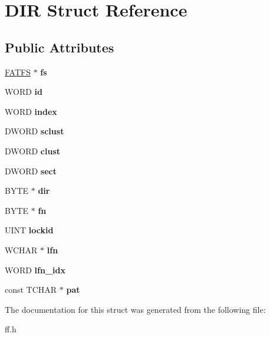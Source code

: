 \hypertarget{struct_d_i_r}{}\section{D\+IR Struct Reference}
\label{struct_d_i_r}
\subsection*{Public Attributes}
\begin{DoxyCompactItemize}
\item 
\mbox{\label{struct_d_i_r_a312eaa66cb703fb2993ea98173dc0c9a}} 
\hyperlink{struct_f_a_t_f_s}{F\+A\+T\+FS} $\ast$ {\bfseries fs}
\item 
\mbox{\label{struct_d_i_r_aca2c95a99a04173917ec70c030891383}} 
W\+O\+RD {\bfseries id}
\item 
\mbox{\label{struct_d_i_r_ab95119fbacbe45e3e9ee0f962b844092}} 
W\+O\+RD {\bfseries index}
\item 
\mbox{\label{struct_d_i_r_a9212af5877b94d790dd3bab3aa320994}} 
D\+W\+O\+RD {\bfseries sclust}
\item 
\mbox{\label{struct_d_i_r_acfbb8ba2d6e73b6f999ceffd1857c190}} 
D\+W\+O\+RD {\bfseries clust}
\item 
\mbox{\label{struct_d_i_r_ad01fcc812ed0dad11a593574336adc9e}} 
D\+W\+O\+RD {\bfseries sect}
\item 
\mbox{\label{struct_d_i_r_a6c2a8c0cf2d55ae99775e93a16593449}} 
B\+Y\+TE $\ast$ {\bfseries dir}
\item 
\mbox{\label{struct_d_i_r_a32da2f31d6c3b6c42eef981cb0cfd2ee}} 
B\+Y\+TE $\ast$ {\bfseries fn}
\item 
\mbox{\label{struct_d_i_r_a4506e8e241aea683cc1cd4d7c8db1008}} 
U\+I\+NT {\bfseries lockid}
\item 
\mbox{\label{struct_d_i_r_af62fd789383e6f1397f74617e11c135d}} 
W\+C\+H\+AR $\ast$ {\bfseries lfn}
\item 
\mbox{\label{struct_d_i_r_acad41b18758c9278c14d47076e8149fc}} 
W\+O\+RD {\bfseries lfn\+\_\+idx}
\item 
\mbox{\label{struct_d_i_r_a1f636884096de91deb97f59209d60e96}} 
const T\+C\+H\+AR $\ast$ {\bfseries pat}
\end{DoxyCompactItemize}


The documentation for this struct was generated from the following file\+:\begin{DoxyCompactItemize}
\item 
ff.\+h\end{DoxyCompactItemize}
